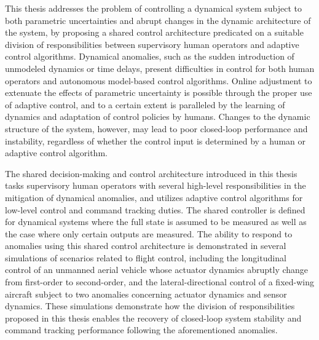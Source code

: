 % 
% 
%

This thesis addresses the problem of controlling a dynamical system subject to both parametric uncertainties and abrupt changes in the dynamic architecture of the system, by proposing a shared control architecture predicated on a suitable division of responsibilities between supervisory human operators and adaptive control algorithms. Dynamical anomalies, such as the sudden introduction of unmodeled dynamics or time delays, present difficulties in control for both human operators and autonomous model-based control algorithms. Online adjustment to extenuate the effects of parametric uncertainty is possible through the proper use of adaptive control, and to a certain extent is paralleled by the learning of dynamics and adaptation of control policies by humans. Changes to the dynamic structure of the system, however, may lead to poor closed-loop performance and instability, regardless of whether the control input is determined by a human or adaptive control algorithm.

The shared decision-making and control architecture introduced in this thesis tasks supervisory human operators with several high-level responsibilities in the mitigation of dynamical anomalies, and utilizes adaptive control algorithms for low-level control and command tracking duties. The shared controller is defined for dynamical systems where the full state is assumed to be measured as well as the case where only certain outputs are measured. The ability to respond to anomalies using this shared control architecture is demonstrated in several simulations of scenarios related to flight control, including the longitudinal control of an unmanned aerial vehicle whose actuator dynamics abruptly change from first-order to second-order, and the lateral-directional control of a fixed-wing aircraft subject to two anomalies concerning actuator dynamics and sensor dynamics. These simulations demonstrate how the division of responsibilities proposed in this thesis enables the recovery of closed-loop system stability and command tracking performance following the aforementioned anomalies. 